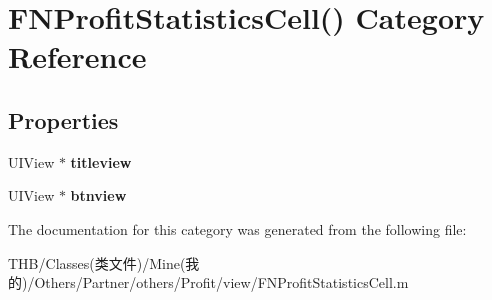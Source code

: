 \hypertarget{category_f_n_profit_statistics_cell_07_08}{}\section{F\+N\+Profit\+Statistics\+Cell() Category Reference}
\label{category_f_n_profit_statistics_cell_07_08}
\subsection*{Properties}
\begin{DoxyCompactItemize}
\item 
\mbox{\label{category_f_n_profit_statistics_cell_07_08_a948220fcfb00e2befeac36a0b3cc4c68}} 
U\+I\+View $\ast$ {\bfseries titleview}
\item 
\mbox{\label{category_f_n_profit_statistics_cell_07_08_a6636e6ace88a25f05fe9aa59968c1d72}} 
U\+I\+View $\ast$ {\bfseries btnview}
\end{DoxyCompactItemize}


The documentation for this category was generated from the following file\+:\begin{DoxyCompactItemize}
\item 
T\+H\+B/\+Classes(类文件)/\+Mine(我的)/\+Others/\+Partner/others/\+Profit/view/F\+N\+Profit\+Statistics\+Cell.\+m\end{DoxyCompactItemize}
